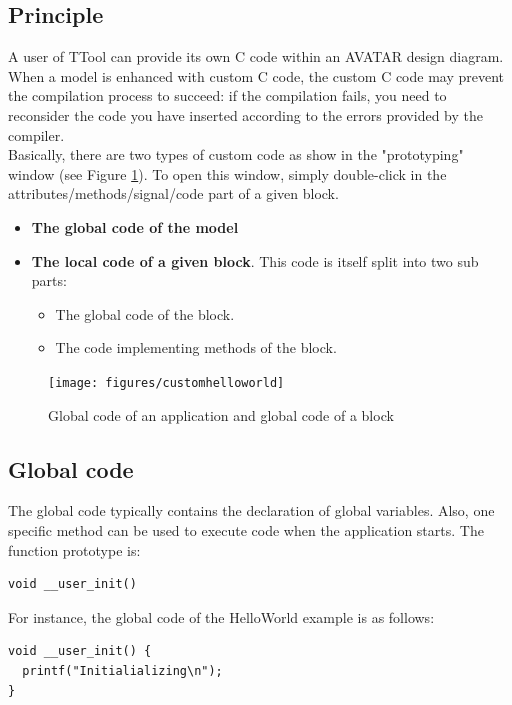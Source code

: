 \documentclass[12pt]{article}
\begin{document}
\subsection{Principle}
A user of TTool can provide its own C code within an AVATAR design diagram. When a model is enhanced with custom C code, the custom C code may prevent the compilation process to succeed: if the compilation fails, you need to reconsider the code you have inserted according to the errors provided by the compiler.\\
Basically, there are two types of custom code as show in the "prototyping" window (see Figure \ref{fig:customhelloworld}). To open this window, simply double-click in the attributes/methods/signal/code part of a given block.
\begin{itemize}
\item \textbf{The global code of the model}
\item \textbf{The local code of a given block}. This code is itself split into two sub parts:
\begin{itemize}
\item The global code of the block.
\item The code implementing methods of the block.
\end{itemize}
\end{itemize}

\begin{figure}[htbp]
\centering
\texttt{[image: figures/customhelloworld]}
\caption{Global code of an application and global code of a block} \label{fig:customhelloworld}
\end{figure}

\subsection{Global code}
The global code typically contains the declaration of global variables. Also, one specific method can be used to execute code when the application starts. The function prototype is: 
\begin{verbatim}
void __user_init()
\end{verbatim}
For instance, the global code of the HelloWorld example is as follows:
\begin{lstlisting}
void __user_init() {
  printf("Initialializing\n");
}
\end{lstlisting}
\end{document}
